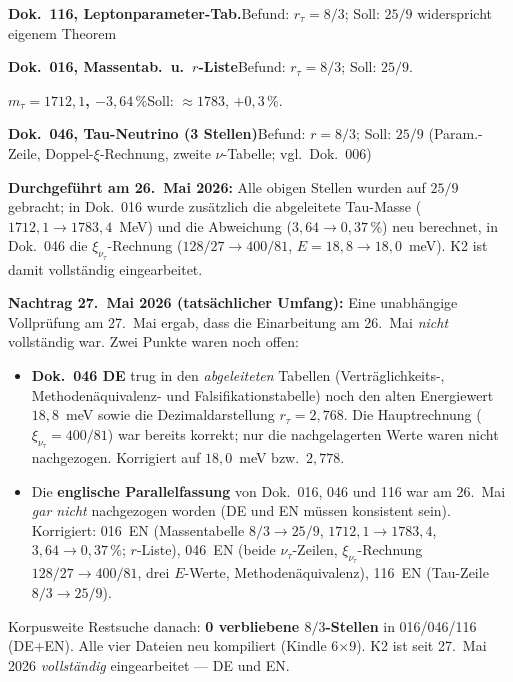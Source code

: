 \smallskip\noindent \textbf{Dok.~116, Leptonparameter-Tab.}\quad Befund: $r_\tau = 8/3$; Soll: $25/9$ widerspricht eigenem Theorem

\smallskip\noindent \textbf{Dok.~016, Massentab.\ u.\ $r$-Liste}\quad Befund: $r_\tau = 8/3$; Soll: $25/9$.

\smallskip\noindent \textbf{$m_\tau = 1712{,}1$, $-3{,}64\,\%$}\quad Soll: $\approx 1783$, $+0{,}3\,\%$.

\smallskip\noindent \textbf{Dok.~046, Tau-Neutrino (3 Stellen)}\quad Befund: $r = 8/3$; Soll: $25/9$ (Param.-Zeile, Doppel-$\xi$-Rechnung, zweite $\nu$-Tabelle; vgl.\ Dok.~006)

\medskip


\noindent\textbf{Durchgeführt am 26.~Mai 2026:} Alle obigen Stellen
wurden auf $25/9$ gebracht; in Dok.~016 wurde zusätzlich die
abgeleitete Tau-Masse ($1712{,}1 \to 1783{,}4$~MeV) und die Abweichung
($3{,}64 \to 0{,}37\,\%$) neu berechnet, in Dok.~046 die
$\xi_{\nu_\tau}$-Rechnung ($128/27 \to 400/81$, $E = 18{,}8 \to
18{,}0$~meV). K2 ist damit vollständig eingearbeitet.

\medskip
\noindent\textbf{Nachtrag 27.~Mai 2026 (tatsächlicher Umfang):} Eine
unabhängige Vollprüfung am 27.~Mai ergab, dass die Einarbeitung am 26.~Mai
\emph{nicht} vollständig war. Zwei Punkte waren noch offen:
\begin{itemize}
  \item \textbf{Dok.~046 DE} trug in den \emph{abgeleiteten} Tabellen
        (Verträglichkeits-, Methodenäquivalenz- und Falsifikationstabelle)
        noch den alten Energiewert $18{,}8$~meV sowie die Dezimaldarstellung
        $r_\tau = 2{,}768$. Die Hauptrechnung ($\xi_{\nu_\tau} = 400/81$) war
        bereits korrekt; nur die nachgelagerten Werte waren nicht nachgezogen.
        Korrigiert auf $18{,}0$~meV bzw.\ $2{,}778$.
  \item Die \textbf{englische Parallelfassung} von Dok.~016, 046 und 116 war
        am 26.~Mai \emph{gar nicht} nachgezogen worden (DE und EN müssen
        konsistent sein). Korrigiert: 016~EN (Massentabelle $8/3 \to 25/9$,
        $1712{,}1 \to 1783{,}4$, $3{,}64 \to 0{,}37\,\%$; $r$-Liste),
        046~EN (beide $\nu_\tau$-Zeilen, $\xi_{\nu_\tau}$-Rechnung
        $128/27 \to 400/81$, drei $E$-Werte, Methodenäquivalenz),
        116~EN (Tau-Zeile $8/3 \to 25/9$).
\end{itemize}
\noindent Korpusweite Restsuche danach: \textbf{0 verbliebene $8/3$-Stellen}
in 016/046/116 (DE+EN). Alle vier Dateien neu kompiliert (Kindle 6×9).
K2 ist seit 27.~Mai 2026 \emph{vollständig} eingearbeitet --- DE und EN.

